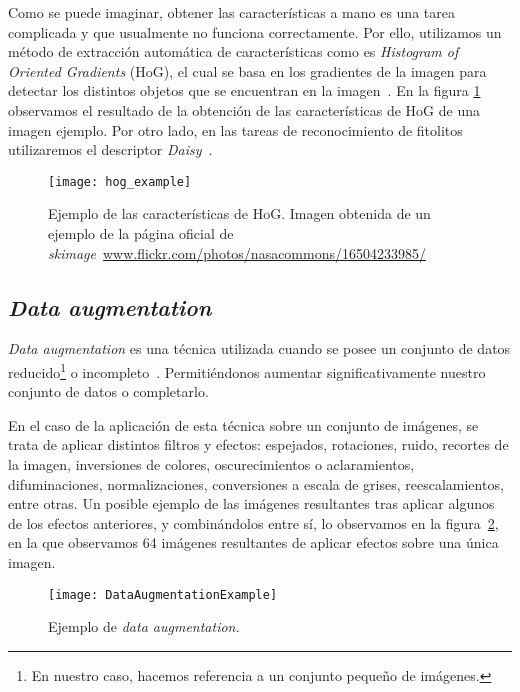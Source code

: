 Como se puede imaginar, obtener las características a mano es una tarea complicada y que usualmente no funciona correctamente. Por ello, utilizamos un método de extracción automática de características como es \textit{Histogram of Oriented Gradients} (HoG), el cual se basa en los gradientes de la imagen para detectar los distintos objetos que se encuentran en la imagen~\cite{wiki:hog}. En la figura \ref{fig:3.4.2} observamos el resultado de la obtención de las características de HoG de una imagen ejemplo. Por otro lado, en las tareas de reconocimiento de fitolitos utilizaremos el descriptor \textit{Daisy}~\cite{daisy}.

\begin{figure}
\centering
\texttt{[image: hog\_example]}
\caption[Ejemplo de las características de HoG]{Ejemplo de las características de HoG. Imagen obtenida de un ejemplo de la página oficial de \textit{skimage}~\url{www.flickr.com/photos/nasacommons/16504233985/}}
\label{fig:3.4.2}
\end{figure}

\subsection{\textit{Data augmentation}}

\textit{Data augmentation} es una técnica utilizada cuando se posee un conjunto de datos reducido\footnote{En nuestro caso, hacemos referencia a un conjunto pequeño de imágenes.} o incompleto~\cite{emalgorithm}. Permitiéndonos aumentar significativamente nuestro conjunto de datos o completarlo. 

En el caso de la aplicación de esta técnica sobre un conjunto de imágenes, se trata de aplicar distintos filtros y efectos: espejados, rotaciones, ruido, recortes de la imagen, inversiones de colores, oscurecimientos o aclaramientos, difuminaciones, normalizaciones, conversiones a escala de grises, reescalamientos, entre otras. Un posible ejemplo de las imágenes resultantes tras aplicar algunos de los efectos anteriores, y combinándolos entre sí, lo observamos en la figura~\ref{fig:3.4.1}, en la que observamos 64 imágenes resultantes de aplicar efectos sobre una única imagen.

\begin{figure}
\centering
\texttt{[image: DataAugmentationExample]}
\caption{Ejemplo de \textit{data augmentation.}}
\label{fig:3.4.1}
\end{figure}


